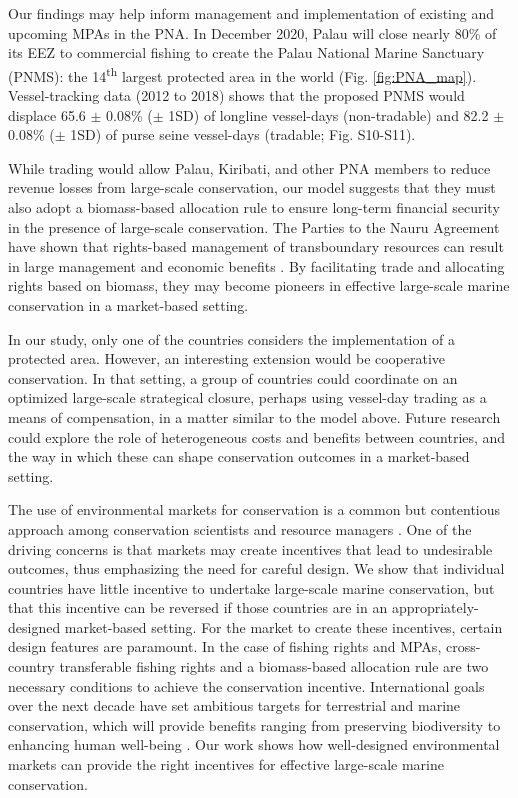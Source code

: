 \documentclass[12pt]{article}
\begin{document}
Our findings may help inform management and implementation of existing and upcoming MPAs in the PNA. In December 2020, Palau will close nearly 80\% of its EEZ to commercial fishing to create the Palau National Marine Sanctuary (PNMS): the 14\textsuperscript{th} largest protected area in the world (Fig. \ref{fig:PNA_map}). Vessel-tracking data (2012 to 2018) shows that the proposed PNMS would displace 65.6 $\pm$ 0.08\% ($\pm$ 1SD) of longline vessel-days (non-tradable) and 82.2 $\pm$ 0.08\% ($\pm$ 1SD) of purse seine vessel-days (tradable; Fig. S10-S11).

While trading would allow Palau, Kiribati, and other PNA members to reduce revenue losses from large-scale conservation, our model suggests that they must also adopt a biomass-based allocation rule to ensure long-term financial security in the presence of large-scale conservation. The Parties to the Nauru Agreement have shown that rights-based management of transboundary resources can result in large management and economic benefits \cite{havice_2013,aqorau_2018}. By facilitating trade and allocating rights based on biomass, they may become pioneers in effective large-scale marine conservation in a market-based setting.

In our study, only one of the countries considers the implementation of a protected area. However, an interesting extension would be cooperative conservation. In that setting, a group of countries could coordinate on an optimized large-scale strategical closure, perhaps using vessel-day trading as a means of compensation, in a matter similar to the model above. Future research could explore the role of heterogeneous costs and benefits between countries, and the way in which these can shape conservation outcomes in a market-based setting.

The use of environmental markets for conservation is a common but contentious approach among conservation scientists and resource managers \cite{sandbrook_2019}. One of the driving concerns is that markets may create incentives that lead to undesirable outcomes, thus emphasizing the need for careful design. We show that individual countries have little incentive to undertake large-scale marine conservation, but that this incentive can be reversed if those countries are in an appropriately-designed market-based setting. For the market to create these incentives, certain design features are paramount. In the case of fishing rights and MPAs, cross-country transferable fishing rights and a biomass-based allocation rule are two necessary conditions to achieve the conservation incentive. International goals over the next decade have set ambitious targets for terrestrial and marine conservation, which will provide benefits ranging from preserving biodiversity to enhancing human well-being \cite{oleary_2016,dinerstein_2019,roberts_2017,ban_2019}. Our work shows how well-designed environmental markets can provide the right incentives for effective large-scale marine conservation.
\end{document}
